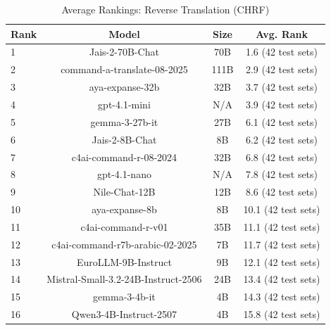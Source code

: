 \begin{table}[htbp]
\centering
\caption{Average Rankings: Reverse Translation (CHRF)}
\label{tab:avg_rankings_chrf}
\begin{tabular}{l@{\hspace{3pt}}c@{\hspace{3pt}}c@{\hspace{3pt}}c}
\toprule
Rank & Model & Size & Avg. Rank \\
\midrule
1 & Jais-2-70B-Chat & 70B & 1.6 (42 test sets) \\
2 & command-a-translate-08-2025 & 111B & 2.9 (42 test sets) \\
3 & aya-expanse-32b & 32B & 3.7 (42 test sets) \\
4 & gpt-4.1-mini & N/A & 3.9 (42 test sets) \\
5 & gemma-3-27b-it & 27B & 6.1 (42 test sets) \\
6 & Jais-2-8B-Chat & 8B & 6.2 (42 test sets) \\
7 & c4ai-command-r-08-2024 & 32B & 6.8 (42 test sets) \\
8 & gpt-4.1-nano & N/A & 7.8 (42 test sets) \\
9 & Nile-Chat-12B & 12B & 8.6 (42 test sets) \\
10 & aya-expanse-8b & 8B & 10.1 (42 test sets) \\
11 & c4ai-command-r-v01 & 35B & 11.1 (42 test sets) \\
12 & c4ai-command-r7b-arabic-02-2025 & 7B & 11.7 (42 test sets) \\
13 & EuroLLM-9B-Instruct & 9B & 12.1 (42 test sets) \\
14 & Mistral-Small-3.2-24B-Instruct-2506 & 24B & 13.4 (42 test sets) \\
15 & gemma-3-4b-it & 4B & 14.3 (42 test sets) \\
16 & Qwen3-4B-Instruct-2507 & 4B & 15.8 (42 test sets) \\
\bottomrule
\end{tabular}
\end{table}